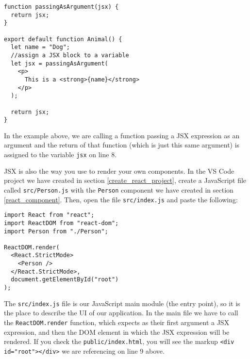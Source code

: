 \documentclass[a4paper, oneside, titlepage, 12pt]{book}
\begin{document}
\begin{verbatim}
function passingAsArgument(jsx) {
  return jsx;
}

export default function Animal() {
  let name = "Dog";
  //assign a JSX block to a variable
  let jsx = passingAsArgument(
    <p>
      This is a <strong>{name}</strong>
    </p>
  );

  return jsx;
}
\end{verbatim}

In the example above, we are calling a function passing a JSX expression as an argument and the return of that function (which is just this same argument) is assigned to the variable \texttt{jsx} on line 8.
\newline

JSX is also the way you use to render your own components. In the VS Code project we have created in section \ref{create_react_project}, create a JavaScript file called \texttt{src/Person.js} with the \texttt{Person} component we have created in section \ref{react_component}. Then, open the file \texttt{src/index.js} and paste the following:

\begin{verbatim}
import React from "react";
import ReactDOM from "react-dom";
import Person from "./Person";

ReactDOM.render(
  <React.StrictMode>
    <Person />
  </React.StrictMode>,
  document.getElementById("root")
);
\end{verbatim}

The \texttt{src/index.js} file is our JavaScript main module (the entry point), so it is the place to describe the UI of our application. In the main file we have to call the \texttt{ReactDOM.render} function, which expects as their first argument a JSX expression, and then the DOM element in which the JSX expression will be rendered. If you check the \texttt{public/index.html}, you will see the markup \texttt{<div id="root"></div>} we are referencing on line 9 above. 
\end{document}
